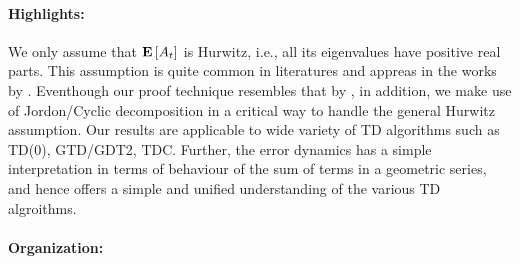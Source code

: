 \paragraph{Highlights:}
 We only assume that $\mathbf{E}\left[A_t\right]$ is Hurwitz, i.e., all its eigenvalues have positive real parts. This assumption is quite common in literatures and appreas in the works by \cite{polyak-judisky,borkarbook}. Eventhough our proof technique resembles that by \cite{bach}, in addition, we make use of Jordon/Cyclic decomposition in a critical way to handle the general Hurwitz assumption. Our results are applicable to wide variety of TD algorithms such as TD(0), GTD/GDT2, TDC. Further, the error dynamics has a simple interpretation in terms of behaviour of the sum of terms in a geometric series, and hence offers a simple and unified understanding of the various TD algroithms.
\paragraph{Organization:}
